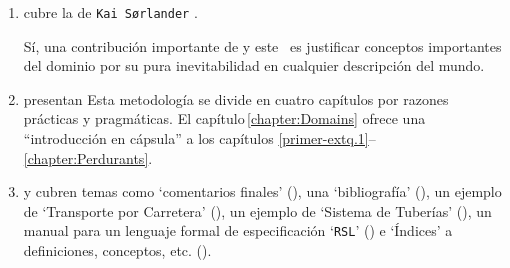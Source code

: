 \begin{enumerate}
\item {} cubre la  de
      \texttt{Kai S{\o}rlander}
      \cite{kaisorlander1994,kaisorlander1997,kaisorlander2002,kaisorlander2016,kaisorlander2022}.

      Sí, una contribución importante de \cite{BjornerMonograph2020} y
      este \manual\ es justificar conceptos importantes del dominio por
      su pura inevitabilidad en cualquier descripción del mundo.

\item {} presentan  Esta metodología se divide en cuatro capítulos por razones prácticas
    y pragmáticas. El capítulo\,\ref{chapter:Domains} ofrece una ``introducción
    en cápsula'' a los capítulos\,\,\ref{primer-extq.1}--\ref{chapter:Perdurants}. %
  
\item {}
  y  cubren
  temas como `comentarios finales' (\sort{\ref{chapter:Closing}}), una `bibliografía' (\sort{\ref{primer.bib}}), un ejemplo de `Transporte
  por Carretera' (\sort{\ref{Chapter:Road Transport}}), un ejemplo de `Sistema de Tuberías' (\sort{\ref{appendix:Pipelines}}), un manual para un lenguaje formal de especificación `\texttt{RSL}' (\sort{\ref{RSL-intro}}) e `Índices' a definiciones, conceptos, etc. (\sort{\ref{primer.indexes}}).
\end{enumerate}

\label{sec:Prerequisite Skills}

